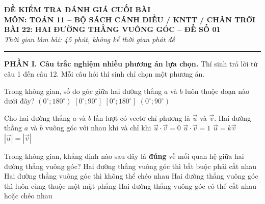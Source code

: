 \begin{center}
    \textbf{\LARGE ĐỀ KIỂM TRA ĐÁNH GIÁ CUỐI BÀI}\\
    \textbf{\Large MÔN: TOÁN 11 -- BỘ SÁCH CÁNH DIỀU / KNTT / CHÂN TRỜI}\\
    \textbf{\large BÀI 22: HAI ĐƯỜNG THẲNG VUÔNG GÓC -- ĐỀ SỐ 01}\\
    \textit{Thời gian làm bài: 45 phút, không kể thời gian phát đề}
\end{center}
\hrule
\vspace{0.5cm}

\noindent\textbf{\large PHẦN I. Câu trắc nghiệm nhiều phương án lựa chọn.} Thí sinh trả lời từ câu 1 đến câu 12. Mỗi câu hỏi thí sinh chỉ chọn một phương án.

\begin{ex}
    Trong không gian, số đo góc giữa hai đường thẳng $a$ và $b$ luôn thuộc đoạn nào dưới đây?
    \choice
    {$(0^\circ; 180^\circ)$}
    {\True $[0^\circ; 90^\circ]$}
    {$[0^\circ; 180^\circ]$}
    {$(0^\circ; 90^\circ)$}
\end{ex}

\begin{ex}
    Cho hai đường thẳng $a$ và $b$ lần lượt có vectơ chỉ phương là $\vec{u}$ và $\vec{v}$. Hai đường thẳng $a$ và $b$ vuông góc với nhau khi và chỉ khi
    \choice
    {\True $\vec{u} \cdot \vec{v} = 0$}
    {$\vec{u} \cdot \vec{v} = 1$}
    {$\vec{u} = k\vec{v}$}
    {$|\vec{u}| = |\vec{v}|$}
\end{ex}

\begin{ex}
    Trong không gian, khẳng định nào sau đây là \textbf{đúng} về mối quan hệ giữa hai đường thẳng vuông góc?
    \choice
    {Hai đường thẳng vuông góc thì bắt buộc phải cắt nhau}
    {Hai đường thẳng vuông góc thì không thể chéo nhau}
    {Hai đường thẳng vuông góc thì luôn cùng thuộc một mặt phẳng}
    {\True Hai đường thẳng vuông góc có thể cắt nhau hoặc chéo nhau}
\end{ex}

